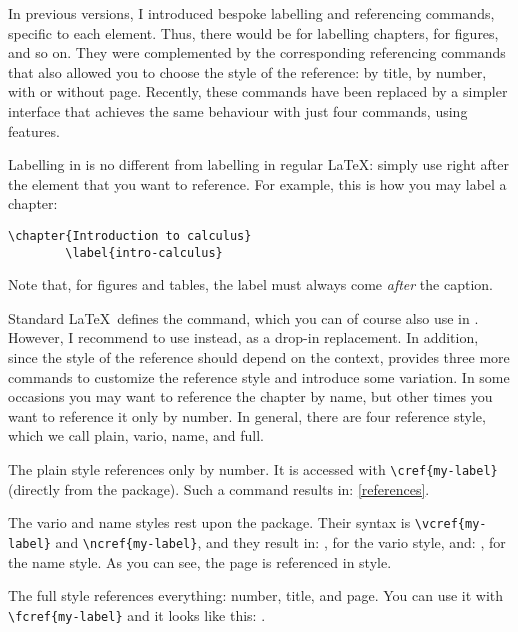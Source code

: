 In previous  versions, I introduced bespoke labelling and
referencing commands, specific to each element. Thus, there would be
 for labelling chapters,  for figures,
and so on. They were complemented by the corresponding referencing
commands that also allowed you to choose the style of the reference: by
title, by number, with or without page. Recently, these commands have
been replaced by a simpler interface that achieves the same behaviour
with just four commands, using  features.

Labelling in  is no different from labelling in regular
\LaTeX: simply use  right after the element
that you want to reference. For example, this is how you may label a
chapter:
\begin{lstlisting}[style=kaolstplain]
        \chapter{Introduction to calculus}
        \label{intro-calculus}
\end{lstlisting}
Note that, for figures and tables, the label must always come
\textit{after} the caption.

Standard \LaTeX\ defines the  command, which you can
of course also use in . However, I recommend to use
 instead, as a drop-in replacement. In addition, since the
style of the reference should depend on the context, 
provides three more commands to customize the reference style and
introduce some variation. In some occasions you may want to reference
the chapter by name, but other times you want to reference it only by
number. In general, there are four reference style, which we call plain,
vario, name, and full.

The plain style references only by number. It is accessed with
\lstinline|\cref{my-label}| (directly from the 
package). Such a command results in: \cref{references}.

The vario and name styles rest upon the 
package. Their syntax is \lstinline|\vcref{my-label}| and
\lstinline|\ncref{my-label}|, and they result in: ,
for the vario style, and: , for the name style. As you
can see, the page is referenced in  style.

The full style references everything: number, title, and page. You
can use it with \lstinline|\fcref{my-label}| and it looks like this:
.


